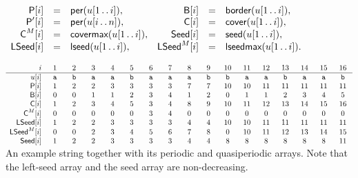 \documentclass{llncs}
\newcommand{\per}{\textsf{per}}
\newcommand{\border}{\textsf{border}}
\newcommand{\cover}{\textsf{cover}}
\newcommand{\covermax}{\textsf{covermax}}
\newcommand{\lseed}{\textsf{lseed}}
\newcommand{\lseedmax}{\textsf{lseedmax}}
\newcommand{\seed}{\textsf{seed}}
\newcommand{\Cover}{\textsf{C}}
\newcommand{\LSeed}{\textsf{LSeed}}
\newcommand{\Seed}{\textsf{Seed}}
\newcommand{\Border}{\textsf{B}}
\newcommand{\Period}{\textsf{P}}
\def\dotdot{\mathinner{\ldotp\ldotp}}
\begin{document}
    \smallskip
    $
      \begin{array}{rcl@{\quad}rcl}
        \Period[i]  &=& \per(u[1 \dotdot i]),      &
        \Border[i]  &=& \border(u[1 \dotdot i]),   \\
        \Period'[i] &=& \per(u[i \dotdot n]),   &
        \Cover[i]   &=& \cover(u[1 \dotdot i]),    \\
        \Cover^M[i] &=& \covermax(u[1 \dotdot i]), &
        \Seed[i]    &=& \seed (u[1 \dotdot i]),    \\
        \LSeed[i]   &=& \lseed(u[1 \dotdot i]),    &
        \LSeed^M[i] &=& \lseedmax(u[1 \dotdot i]).
      \end{array}
    $

    \begin{table}
    $
      \begin{array}{r@{\quad}*{16}{c}}
        i & 1 & 2 & 3 & 4 & 5 & 6 & 7 & 8 & 9 & 10 & 11 & 12 & 13 & 14 & 15 & 16 \\
        \hline
        u[i] &\texttt{~a~}&\texttt{~b~}&\texttt{~a~}&\texttt{~a~}&\texttt{~b~}&\texttt{~a~}&\texttt{~a~}&\texttt{~a~}&
        \texttt{~b~}&\texttt{~b~}&  \texttt{~a~}&\texttt{~a~}&\texttt{~b~}&\texttt{~a~}&\texttt{~a~}&\texttt{~b~}\\
        \Period[i]   & 1 & 2 & 2 & 3 & 3 & 3 & 3 & 7 & 7 & 10 & 10 & 11 & 11 & 11 & 11 & 11\\
        \Border[i]   & 0 & 0 & 1 & 1 & 2 & 3 & 4 & 1 & 2 &  0 &  1 &  1 &  2 &  3 &  4 &  5\\
        \Cover[i]    & 1 & 2 & 3 & 4 & 5 & 3 & 4 & 8 & 9 & 10 & 11 & 12 & 13 & 14 & 15 & 16\\
        \Cover^M[i]  & 0 & 0 & 0 & 0 & 0 & 3 & 4 & 0 & 0 & 0 & 0 & 0 & 0 & 0 & 0 & 0\\
        \LSeed[i]    & 1 & 2 & 2 & 3 & 3 & 3 & 3 & 4 & 4 & 10 & 10 & 11 & 11 & 11 & 11 & 11\\
        \LSeed^M[i]  & 0 & 0 & 2 & 3 & 4 & 5 & 6 & 7 & 8 &  0 & 10 & 11 & 12 & 13 & 14 & 15\\
        \Seed[i]     & 1 & 2 & 2 & 3 & 3 & 3 & 3 & 4 & 4 &  8 &  8 &  8 &  8 &  8 &  8 & 11\\
      \end{array}
    $\\
    \caption{
      \label{tab:tab1}
      An example string together with its periodic and quasiperiodic arrays.
      Note that the left-seed array and the seed array are non-decreasing.
    }
    \end{table}
\end{document}
